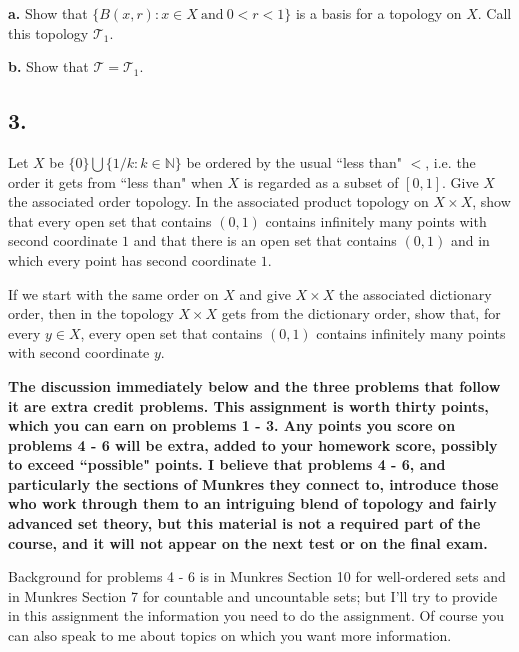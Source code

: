 \documentclass{amsart}
\theoremstyle{plain}
\theoremstyle{definition}
\theoremstyle{remark}
\begin{document}
\vspace{.1in}
{\bfseries a.} Show that $\{ B(x,r) : x\in X \ \mbox{and} \ 0<r<1\}$ is a basis for a topology on $X$. Call this topology $\mathcal T _1$. 

\vspace{.1in}
{\bfseries b.} Show that $\mathcal T = \mathcal T _1$. 



\vspace{.15in}

\noindent
\subsection*{3.} Let $X$ be $\{0\} \bigcup \{ 1/k : k\in \mathbb N \}$ be ordered by the usual ``less than" $<$, i.e. the order it gets from ``less than" when $X$ is regarded as a subset of $[0,1]$. Give $X$ the associated order topology. In the associated product topology on $X\times X$, show that every open set that contains $(0,1)$ contains infinitely many points with second coordinate $1$ and that there is an open set that contains $(0,1)$ and in which every point has second coordinate $1$. 

If we start with the same order on $X$ and give $X\times X$ the associated dictionary order, then in the topology $X\times X$ gets from the dictionary order, show that, for every $y\in X$, every open set that contains $(0,1)$ contains infinitely many points with second coordinate $y$.

\vspace{.25in} {\bf The discussion immediately below and the three problems that follow it are extra credit problems. This assignment is worth thirty points, which you can earn on problems 1 - 3. Any points you score on problems 4 - 6 will be extra, added to your homework score, possibly to exceed ``possible" points. I believe that problems 4 - 6, and particularly the sections of Munkres they connect to, introduce those who work through them to an intriguing blend of topology and fairly advanced set theory, but this material is not a required part of the course, and it will not appear on the next test or on the final exam.}
 

\vspace{.25in}
Background for problems 4 - 6 is in Munkres Section 10 for well-ordered sets and in Munkres Section 7 for countable and uncountable sets; but I'll try to provide in this assignment the information you need to do the assignment. Of course you can also speak to me about topics on which you want more information. 
\end{document}
